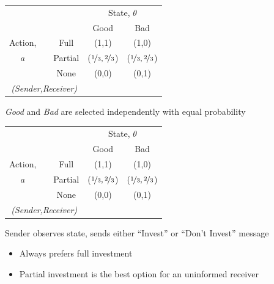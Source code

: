 \documentclass{beamer}
\begin{document}
\begin{frame}
\begin{card}[Payoffs]
	\begin{center}%
		\begin{tabular}{c|cc|c|c|}
		\multicolumn{1}{c}{} &  & \multicolumn{1}{c}{} & \multicolumn{2}{c}{State, $\theta$} \\ 
		\cline{4-5} 
		\multicolumn{1}{c}{} &  & \multicolumn{1}{c}{} & \multicolumn{1}{c}{Good} & \multicolumn{1}{c}{Bad} \\ 
		\cline{4-5} 
		Action, &  & Full & (1,1) & (1,0) \\ 
		\cline{4-5} 
		$a$ &  & Partial & ($\nicefrac{1}{3},\nicefrac{2}{3}$) & ($\nicefrac{1}{3},\nicefrac{2}{3}$) \\ 
		\cline{4-5} 
		 &  & None & (0,0) & (0,1) \\ 
		\cline{4-5} 
		\multicolumn{3}{c}{\emph{(Sender,Receiver)}} & \multicolumn{1}{c}{} & \multicolumn{1}{c}{} \\ 
		\end{tabular}
	\end{center}
\end{card}
\begin{card}
 \emph{Good} and \emph{Bad} are selected independently with equal probability
\end{card}
\end{frame}
\begin{frame}
\begin{card}[Payoffs]
	\begin{center}%
		\begin{tabular}{c|cc|c|c|}
		\multicolumn{1}{c}{} &  & \multicolumn{1}{c}{} & \multicolumn{2}{c}{State, $\theta$} \\ 
		\cline{4-5} 
		\multicolumn{1}{c}{} &  & \multicolumn{1}{c}{} & \multicolumn{1}{c}{Good} & \multicolumn{1}{c}{Bad} \\ 
		\cline{4-5} 
		Action, &  & Full & (1,1) & (1,0) \\ 
		\cline{4-5} 
		$a$ &  & Partial & ($\nicefrac{1}{3},\nicefrac{2}{3}$) & ($\nicefrac{1}{3},\nicefrac{2}{3}$) \\ 
		\cline{4-5} 
		 &  & None & (0,0) & (0,1) \\ 
		\cline{4-5} 
		\multicolumn{3}{c}{\emph{(Sender,Receiver)}} & \multicolumn{1}{c}{} & \multicolumn{1}{c}{} \\ 
		\end{tabular}
	\end{center}
\end{card}
\begin{card}
 Sender observes state, sends either ``Invest'' or ``Don't Invest''
	message
		\begin{itemize}
			\item Always prefers full investment
			\item Partial investment is the best option for an uninformed receiver
		\end{itemize}
\end{card}
\end{frame}
\end{document}
